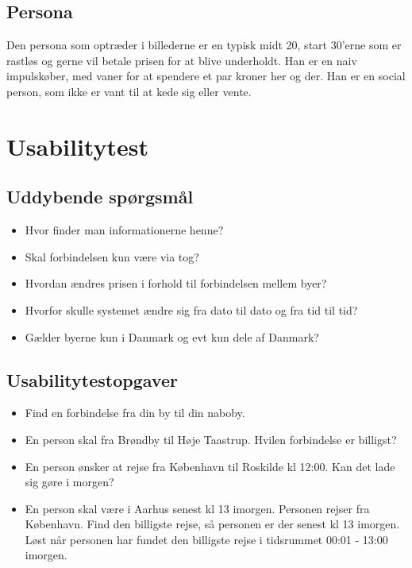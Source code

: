 \documentclass[12pt,a4paper,oneside]{article}
\begin{document}
\subsection{Persona}

Den persona som optræder i billederne er en typisk midt 20, start 30'erne som er rastløs og gerne vil betale prisen for at blive underholdt. Han er en naiv impulskøber, med vaner for at spendere et par kroner her og der. Han er en social person, som ikke er vant til at kede sig eller vente.

\section{Usabilitytest}

\subsection{Uddybende spørgsmål}

\begin{itemize}
\item{Hvor finder man informationerne henne?}
\item{Skal forbindelsen kun være via tog?}
\item{Hvordan ændres prisen i forhold til forbindelsen mellem byer?}
\item{Hvorfor skulle systemet ændre sig fra dato til dato og fra tid til tid?}
\item{Gælder byerne kun i Danmark og evt kun dele af Danmark?}
\end{itemize}
 
\subsection{Usabilitytestopgaver}

\begin{itemize}
\item{Find en forbindelse fra din by til din naboby.}
\item{En person skal fra Brøndby til Høje Taastrup. Hvilen forbindelse er billigst?}
\item{En person ønsker at rejse fra København til Roskilde kl 12:00. Kan det lade sig gøre i morgen? }
\item{En person skal være i Aarhus senest kl 13 imorgen. Personen rejser fra København. Find den billigste rejse, så personen er der senest kl 13 imorgen. Løst når personen har fundet den billigste rejse i tidsrummet 00:01 - 13:00 imorgen.}
\end{itemize}
\end{document}
